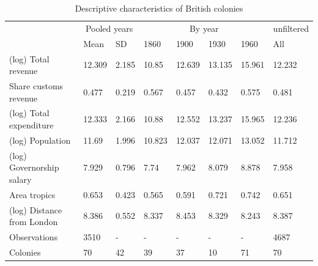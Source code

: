 \documentclass[a4paper]{article}\usepackage[]{graphicx}\usepackage[]{color}
\begin{document}
\begin{table}[!h]

\caption{\label{tab:descriptives2}Descriptive characteristics of British colonies}
\centering
\fontsize{7}{9}\selectfont
\begin{tabular}[t]{llllllll}
\toprule
\multicolumn{1}{c}{ } & \multicolumn{2}{c}{Pooled years} & \multicolumn{4}{c}{By year} & \multicolumn{1}{c}{unfiltered} \\
\cmidrule(l{3pt}r{3pt}){2-3} \cmidrule(l{3pt}r{3pt}){4-7} \cmidrule(l{3pt}r{3pt}){8-8}
  & Mean & SD & 1860 & 1900 & 1930 & 1960 & All\\
\midrule
(log) Total revenue & 12.309 & 2.185 & 10.85 & 12.639 & 13.135 & 15.961 & 12.232\\
Share customs revenue & 0.477 & 0.219 & 0.567 & 0.457 & 0.432 & 0.575 & 0.481\\
(log) Total expenditure & 12.333 & 2.166 & 10.88 & 12.552 & 13.237 & 15.965 & 12.236\\
(log) Population & 11.69 & 1.996 & 10.823 & 12.037 & 12.071 & 13.052 & 11.712\\
(log) Governorship salary & 7.929 & 0.796 & 7.74 & 7.962 & 8.079 & 8.878 & 7.958\\
Area tropics & 0.653 & 0.423 & 0.565 & 0.591 & 0.721 & 0.742 & 0.651\\
(log) Distance from London & 8.386 & 0.552 & 8.337 & 8.453 & 8.329 & 8.243 & 8.387\\
Observations & 3510 & - & - & - & - & - & 4687\\
Colonies & 70 & 42 & 39 & 37 & 10 & 71 & 70\\
\bottomrule
\end{tabular}
\end{table}
\end{document}
